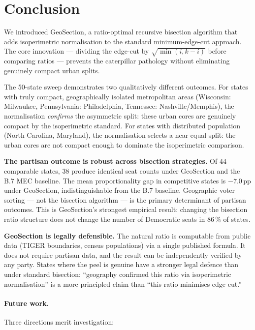 \section{Conclusion}
\label{sec:conclusion}

We introduced GeoSection, a ratio-optimal recursive bisection algorithm that
adds isoperimetric normalisation to the standard minimum-edge-cut approach.
The core innovation --- dividing the edge-cut by $\sqrt{\min(i,k-i)}$ before
comparing ratios --- prevents the caterpillar pathology without eliminating
genuinely compact urban splits.

The 50-state sweep demonstrates two qualitatively different outcomes.
For states with truly compact, geographically isolated metropolitan areas
(Wisconsin: Milwaukee, Pennsylvania: Philadelphia, Tennessee: Nashville/Memphis),
the normalisation \emph{confirms} the asymmetric split: these urban cores
are genuinely compact by the isoperimetric standard.
For states with distributed population (North Carolina, Maryland), the
normalisation selects a near-equal split: the urban cores are not compact
enough to dominate the isoperimetric comparison.

\textbf{The partisan outcome is robust across bisection strategies.}
Of 44 comparable states, 38 produce identical seat counts under GeoSection
and the B.7 MEC baseline.
The mean proportionality gap in competitive states is $-7.0$\,pp under
GeoSection, indistinguishable from the B.7 baseline.
Geographic voter sorting --- not the bisection algorithm --- is the primary
determinant of partisan outcomes.
This is GeoSection's strongest empirical result: changing the bisection
ratio structure does not change the number of Democratic seats in 86\,\%
of states.

\textbf{GeoSection is legally defensible.}
The natural ratio is computable from public data (TIGER boundaries, census
populations) via a single published formula.
It does not require partisan data, and the result can be independently
verified by any party.
States where the peel is genuine have a stronger legal defence than under
standard bisection: ``geography confirmed this ratio via isoperimetric
normalisation'' is a more principled claim than ``this ratio minimises
edge-cut.''

\paragraph{Future work.}
Three directions merit investigation:


